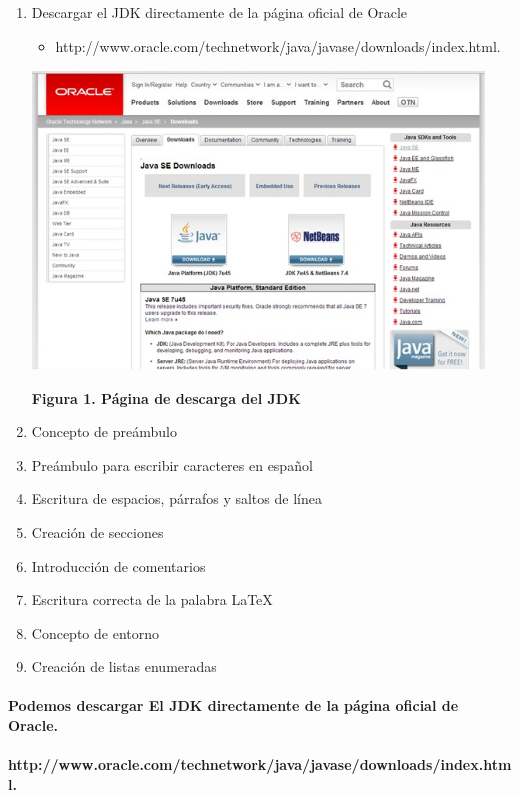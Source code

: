 \documentclass[12pt]{book} %
\begin{document}
\begin{enumerate}
\item Descargar el JDK directamente de la página oficial de Oracle 
	\begin{itemize}
	\item http://www.oracle.com/technetwork/java/javase/downloads/index.html.
	\end{itemize}
	\begin{center}
		\includegraphics[width=12cm]{ins1.jpg}
		\par\textbf{Figura 1. P\'agina de descarga del JDK}
	\end{center}
\item Concepto de preámbulo
\item Preámbulo para escribir caracteres en español
\item Escritura de espacios, párrafos y saltos de línea
\item Creación de secciones
\item Introducción de comentarios
\item Escritura correcta de la palabra \LaTeX
\item Concepto de entorno
\item Creación de listas enumeradas
\end{enumerate}



\paragraph{Podemos descargar El JDK directamente de la página oficial de Oracle.}
\paragraph{http://www.oracle.com/technetwork/java/javase/downloads/index.html.}
\end{document}
